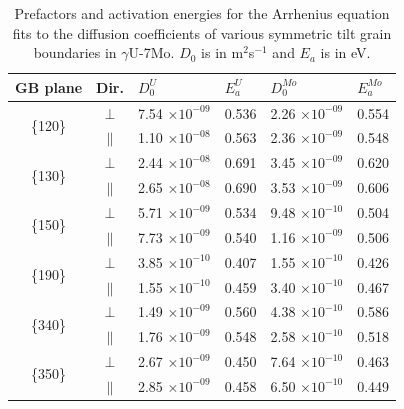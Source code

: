 \documentclass{elsarticle}
\begin{document}
\begin{appendices}
\begin{table}[!ht]
\centering
\caption{Prefactors and activation energies for the Arrhenius equation fits to the diffusion coefficients of various symmetric tilt grain boundaries in $\gamma$U-7Mo. $D_0$ is in m$^2$s$^{-1}$ and $E_a$ is in eV.}
\label{tab:u7mo}
\begin{tabular}{ccllll}
\toprule
GB plane & Dir.
	& $D_{0}^U$      & $E_{a}^U$
	& $D_{0}^{Mo}$   & $E_{a}^{Mo}$ \\
\midrule
\multirow{2}{*}{ \{120\} }
	& $\perp$
	& 7.54 $\times 10^{-09}$ & 0.536
	& 2.26 $\times 10^{-09}$ & 0.554 \\
	& $\parallel$
	& 1.10 $\times 10^{-08}$ & 0.563
	& 2.36 $\times 10^{-09}$ & 0.548 \vspace{0.2cm } \\
\multirow{2}{*}{ \{130\} }
	& $\perp$
	& 2.44 $\times 10^{-08}$ & 0.691
	& 3.45 $\times 10^{-09}$ & 0.620 \\
	& $\parallel$
	& 2.65 $\times 10^{-08}$ & 0.690
	& 3.53 $\times 10^{-09}$ & 0.606 \vspace{0.2cm } \\
\multirow{2}{*}{ \{150\} }
	& $\perp$
	& 5.71 $\times 10^{-09}$ & 0.534
	& 9.48 $\times 10^{-10}$ & 0.504 \\
	& $\parallel$
	& 7.73 $\times 10^{-09}$ & 0.540
	& 1.16 $\times 10^{-09}$ & 0.506 \vspace{0.2cm } \\
\multirow{2}{*}{ \{190\} }
	& $\perp$
	& 3.85 $\times 10^{-10}$ & 0.407
	& 1.55 $\times 10^{-10}$ & 0.426 \\
	& $\parallel$
	& 1.55 $\times 10^{-10}$ & 0.459
	& 3.40 $\times 10^{-10}$ & 0.467 \vspace{0.2cm } \\
\multirow{2}{*}{ \{340\} }
	& $\perp$
	& 1.49 $\times 10^{-09}$ & 0.560
	& 4.38 $\times 10^{-10}$ & 0.586 \\
	& $\parallel$
	& 1.76 $\times 10^{-09}$ & 0.548
	& 2.58 $\times 10^{-10}$ & 0.518 \vspace{0.2cm } \\
\multirow{2}{*}{ \{350\} }
	& $\perp$
	& 2.67 $\times 10^{-09}$ & 0.450
	& 7.64 $\times 10^{-10}$ & 0.463 \\
	& $\parallel$
	& 2.85 $\times 10^{-09}$ & 0.458
	& 6.50 $\times 10^{-10}$ & 0.449 \\
\bottomrule
\end{tabular}
\end{table}


\end{appendices}
\end{document}
